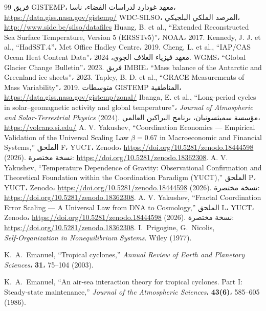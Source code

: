\documentclass[11pt,a4paper]{article}
\begin{document}
	\begin{thebibliography}{99}
		 فريق GISTEMP، معهد غودارد لدراسات الفضاء، ناسا، \url{https://data.giss.nasa.gov/gistemp/}
		 WDC-SILSO، المرصد الملكي البلجيكي، \url{http://www.sidc.be/silso/datafiles}
		 Huang, B. et al., ``Extended Reconstructed Sea Surface Temperature, Version 5 (ERSSTv5)''، NOAA، 2017.
		 Kennedy, J. J. et al., ``HadSST.4''، Met Office Hadley Centre، 2019.
		 Cheng, L. et al., ``IAP/CAS Ocean Heat Content Data''، معهد فيزياء الغلاف الجوي، 2024.
		 WGMS، ``Global Glacier Change Bulletin''، 2023.
		 فريق IMBIE، ``Mass balance of the Antarctic and Greenland ice sheets''، 2023.
		 Tapley, B. D. et al., ``GRACE Measurements of Mass Variability''، 2019.
		 متوسطات GISTEMP المناطقية، \url{https://data.giss.nasa.gov/gistemp/zonal/}
		 Ibanga, E. et al., ``Long-period cycles in solar–geomagnetic activity and global temperature''، \emph{Journal of Atmospheric and Solar-Terrestrial Physics} (2024).
		 مؤسسة سميثسونيان، برنامج البراكين العالمي، \url{https://volcano.si.edu/}
		 A. V. Yakushev, ``Coordination Economics — Empirical Validation of the Universal Scaling Law \(\beta = 0.67\) in Macroeconomic and Financial Systems,'' الملحق F، YUCT، Zenodo، \url{https://doi.org/10.5281/zenodo.18444598} (2026). نسخة مختصرة: \url{https://doi.org/10.5281/zenodo.18362308}.
		 A. V. Yakushev, ``Temperature Dependence of Gravity: Observational Confirmation and Theoretical Foundation within the Coordination Paradigm (YUCT),'' الملحق P، YUCT، Zenodo، \url{https://doi.org/10.5281/zenodo.18444598} (2026). نسخة مختصرة: \url{https://doi.org/10.5281/zenodo.18362308}.
		 A. V. Yakushev, ``Fractal Coordination Error Scaling — A Universal Law from DNA to Cosmology,'' الملحق L، YUCT، Zenodo، \url{https://doi.org/10.5281/zenodo.18444598} (2026). نسخة مختصرة: \url{https://doi.org/10.5281/zenodo.18362308}.
		I.~Prigogine, G.~Nicolis, \emph{Self‑Organization in Nonequilibrium Systems}. Wiley (1977).
		
		K.~A.~Emanuel, ``Tropical cyclones,'' \emph{Annual Review of Earth and Planetary Sciences}،
		\textbf{31}، 75--104 (2003).
		
		K.~A.~Emanuel, ``An air‑sea interaction theory for tropical cyclones. Part I:
		Steady‑state maintenance,'' \emph{Journal of the Atmospheric Sciences}،
		\textbf{43(6)}، 585--605 (1986).
	\end{thebibliography}
	
\end{document}
